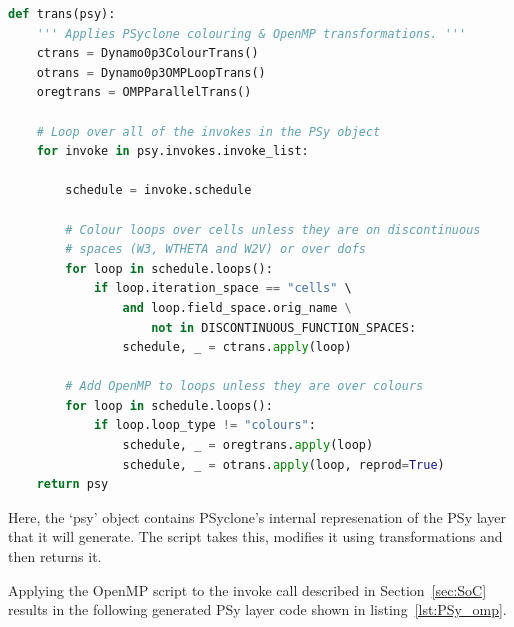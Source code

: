 \documentclass[times]{elsarticle}
\begin{document}
\begin{lstlisting}[language=python,caption={Python script for applying
transformations to a PSyclone schedule.},label={lst:omp.py}]
def trans(psy):
    ''' Applies PSyclone colouring & OpenMP transformations. '''
    ctrans = Dynamo0p3ColourTrans()
    otrans = Dynamo0p3OMPLoopTrans()
    oregtrans = OMPParallelTrans()

    # Loop over all of the invokes in the PSy object
    for invoke in psy.invokes.invoke_list:

        schedule = invoke.schedule

        # Colour loops over cells unless they are on discontinuous
        # spaces (W3, WTHETA and W2V) or over dofs
        for loop in schedule.loops():
            if loop.iteration_space == "cells" \
                and loop.field_space.orig_name \
                    not in DISCONTINUOUS_FUNCTION_SPACES:
                schedule, _ = ctrans.apply(loop)

        # Add OpenMP to loops unless they are over colours
        for loop in schedule.loops():
            if loop.loop_type != "colours":
                schedule, _ = oregtrans.apply(loop)
                schedule, _ = otrans.apply(loop, reprod=True)
    return psy
\end{lstlisting}
Here, the `psy' object contains PSyclone's internal represenation of
the PSy layer that it will generate. The script takes this, modifies
it using transformations and then returns it.

Applying the OpenMP script to the invoke call described in
Section~\ref{sec:SoC} results in the following generated PSy layer
code shown in listing~\ref{lst:PSy_omp}. 
\end{document}
